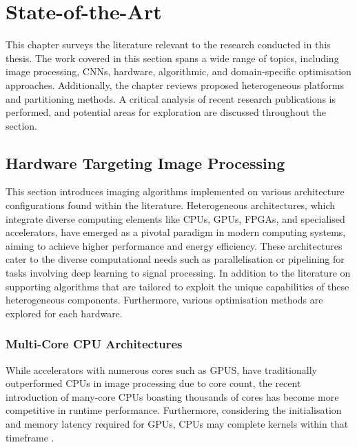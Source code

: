\chapter{State-of-the-Art}
\label{chap:sota}
This chapter surveys the literature relevant to the research conducted in this thesis. The work covered in this section spans a wide range of topics, including image processing, CNNs, hardware, algorithmic, and domain-specific optimisation approaches. Additionally, the chapter reviews proposed heterogeneous platforms and partitioning methods. A critical analysis of recent research publications is performed, and potential areas for exploration are discussed throughout the section.


\section{Hardware Targeting Image Processing}
This section introduces imaging algorithms implemented on various architecture configurations found within the literature. Heterogeneous architectures, which integrate diverse computing elements like CPUs, GPUs, FPGAs, and specialised accelerators, have emerged as a pivotal paradigm in modern computing systems, aiming to achieve higher performance and energy efficiency. These architectures cater to the diverse computational needs such as parallelisation or pipelining for tasks involving deep learning to signal processing. In addition to the literature on supporting algorithms that are tailored to exploit the unique capabilities of these heterogeneous components. Furthermore, various optimisation methods are explored for each hardware.

\subsection{Multi-Core CPU Architectures}
While accelerators with numerous cores such as GPUS, have traditionally outperformed CPUs in image processing due to core count, the recent introduction of many-core CPUs boasting thousands of cores has become more competitive in runtime performance. Furthermore, considering the initialisation and memory latency required for GPUs, CPUs may complete kernels within that timeframe \cite{GreKim11,YukRusTor19,Wszola_2019}.

